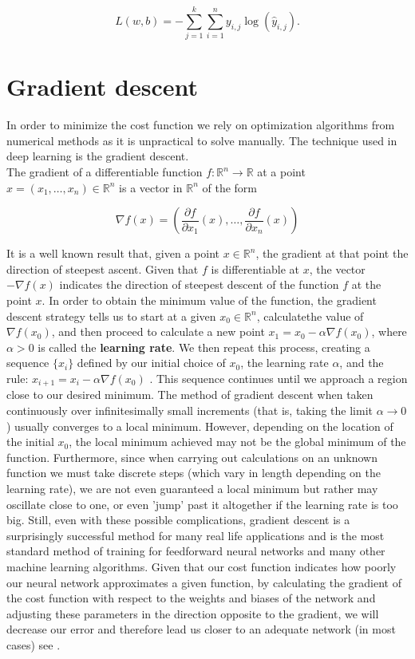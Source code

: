 \begin{equation}
  \label{equ:m_likelihood}
  L(w, b) = - \sum_{j = 1}^k \sum_{i = 1}^{n} y_{i, j} \log(\hat{y}_{i, j}).
\end{equation}

\section{Gradient descent}
In order to minimize the cost function we rely on optimization algorithms from numerical methods as it is unpractical to solve manually. The technique used in deep learning is the gradient descent. \\
The gradient of a differentiable function $f: \mathbb{R}^n \longrightarrow \mathbb{R}$ at a point $x = (x_1, \ldots, x_n) \in \mathbb{R}^n$ is a vector in $\mathbb{R}^n$ of the form

\begin{equation}
  \label{equ:gradient}
  \nabla f(x) = (\frac{\partial f}{\partial x_1} (x), \ldots, \frac{\partial f}{\partial x_n} (x))
\end{equation}

It is a well known result that, given a point $x \in \mathbb{R}^n$, the gradient at that point the direction of steepest ascent. Given that $f$ is differentiable at $x$, the vector $-\nabla f(x)$ indicates the direction of steepest descent of the function $f$ at the point $x$.
In order to obtain the minimum value of the function, the gradient descent strategy tells us to start at a given $x_0 \in \mathbb{R}^n$, calculatethe value of $\nabla f(x_0)$, and then proceed to calculate a new point $x_1 = x_0 − \alpha \nabla f(x_0)$, where $\alpha > 0$ is called the \textbf{learning rate}. We then repeat this process, creating a sequence $\{ x_i \}$ defined by our initial choice of $x_0$, the learning rate $\alpha$, and the rule: $x_{i + 1} = x_{i} − \alpha \nabla f(x_0)$  . This sequence continues until we approach a region close to our desired minimum.
The method of gradient descent when taken continuously over infinitesimally small increments (that is, taking the limit $\alpha \rightarrow 0$) usually converges to a local minimum. However, depending on the location of the initial $x_0$, the local minimum achieved may not be the global minimum of the function. Furthermore, since when carrying out calculations on an unknown function we must take discrete steps (which vary in length depending on the learning rate), we are not even guaranteed a local minimum but rather may oscillate close to one, or even ’jump’ past it altogether if the learning rate is too big. Still, even with these possible complications, gradient descent is a surprisingly successful method for many real life applications and is the most standard method of training for feedforward neural networks and many other machine learning algorithms.
Given that our cost function indicates how poorly our neural network approximates a given function, by calculating the gradient of the cost function with respect to the weights and biases of the network and adjusting these parameters in the direction opposite to the gradient, we will decrease our error and therefore lead us closer to an adequate network (in most cases) see .

